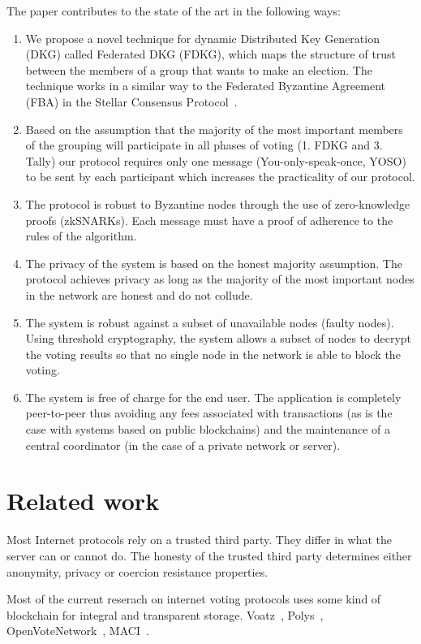 \documentclass{article}
\begin{document}
The paper contributes to the state of the art in the following ways:
\begin{enumerate}
    \item We propose a novel technique for dynamic Distributed Key Generation (DKG) called Federated DKG (FDKG), which maps the structure of trust between the members of a group that wants to make an election. The technique works in a similar way to the Federated Byzantine Agreement (FBA) in the Stellar Consensus Protocol~\cite{mazieresStellarConsensusProtocol2015}.
    \item Based on the assumption that the majority of the most important members of the grouping will participate in all phases of voting (1. FDKG and 3. Tally) our protocol requires only one message (You-only-speak-once, YOSO) to be sent by each participant which increases the practicality of our protocol.
    \item The protocol is robust to Byzantine nodes through the use of zero-knowledge proofs (zkSNARKs). Each message must have a proof of adherence to the rules of the algorithm.
    \item The privacy of the system is based on the honest majority assumption. The protocol achieves privacy as long as the majority of the most important nodes in the network are honest and do not collude.
    \item The system is robust against a subset of unavailable nodes (faulty nodes). Using threshold cryptography, the system allows a subset of nodes to decrypt the voting results so that no single node in the network is able to block the voting.
    \item The system is free of charge for the end user. The application is completely peer-to-peer thus avoiding any fees associated with transactions (as is the case with systems based on public blockchains) and the maintenance of a central coordinator (in the case of a private network or server).
\end{enumerate}

\section{Related work}
Most Internet protocols rely on a trusted third party. They differ in what the server can or cannot do. The honesty of the trusted third party determines either anonymity, privacy or coercion resistance properties.

Most of the current reserach on internet voting protocols uses some kind of blockchain for integral and transparent storage. 
Voatz~\cite{mooreWestVirginiaMobile2019}, 
Polys~\cite{PolysOnlineVoting}, 
OpenVoteNetwork~\cite{haoAnonymousVotingTworound2010}, MACI~\cite{ethereumfoundationMinimalAntiCollusionInfrastructure2022}.
\end{document}
